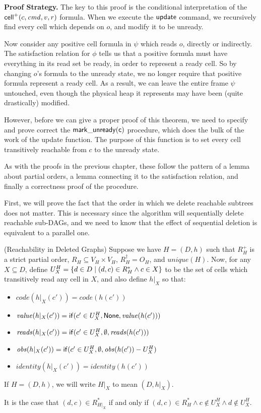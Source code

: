 \textbf{Proof Strategy.} The key to this proof is the conditional
interpretation of the $\mathsf{cell}^{+}({c}, {\mathit{cmd}}, {v}, {r})$ formula. When we execute
the $\mathsf{update}$ command, we recursively find every cell which
depends on $o$, and modify it to be unready.

Now consider any positive cell formula in $\psi$ which reads $o$,
directly or indirectly. The satisfaction relation for $\phi$ tells us
that a positive formula must have everything in its read set be ready,
in order to represent a ready cell. So by changing $o$'s formula to
the unready state, we no longer require that positive formula
represent a ready cell. As a result, we can leave the entire frame
$\psi$ untouched, even though the physical heap it represents may have
been (quite drastically) modified.

However, before we can give a proper proof of this theorem, we need to
specify and prove correct the $\mathsf{mark\_unready(c)}$ procedure,
which does the bulk of the work of the update function. The purpose of
this function is to set every cell transitively reachable from $c$ to
the unready state.

As with the proofs in the previous chapter, these follow the pattern 
of a lemma about partial orders, a lemma connecting it to the satisfaction
relation, and finally a correctness proof of the procedure. 

First, we will prove the fact that the order in which we delete
reachable subtrees does not matter. This is necessary since the 
algorithm will sequentially delete reachable sub-DAGs, and we
need to know that the effect of sequential deletion is equivalent
to a parallel one.  

\begin{lemma}{(Reachability in Deleted Graphs)}
Suppose we have $H = (D,h)$ such that $R^+_H$ is a strict partial
order, $R_H \subseteq V_H \times V_H$, $R^\dagger_H = O_H$, and
$\mathit{unique}(H)$.  Now, for any $X \subseteq D$, define $U^H_X =
\{{{d \in D}\;|\;{(d, c) \in R^*_H \land c \in X}}\}$ to be the set
of cells which transitively read any cell in $X$, and also define
$h|_X$ so that:
\begin{itemize}
\item $\mathit{code}(h|_X(c')) = \mathit{code}(h(c'))$
\item $\mathit{value}(h|_X(c')) = \mathsf{if}({c' \in U^H_X}, {\mathsf{None}}, {\mathit{value}(h(c'))})$
\item $\mathit{reads}(h|_X(c')) = \mathsf{if}({c' \in U^H_X}, {\emptyset}, {\mathit{reads}(h(c'))})$
\item $\mathit{obs}(h|_X(c')) = \mathsf{if}({c' \in U^H_X}, {\emptyset}, {\mathit{obs}(h(c')) - U^H_X})$
\item $\mathit{identity}(h|_X(c')) = \mathit{identity}(h(c'))$
\end{itemize}
If $H = (D,h)$, we will write $H|_X$ to mean $(D,h|_X)$. 

It is the case that $(d,c) \in R^*_{H|_X}$ if and only if $(d,c) \in R^*_H \land c \not\in U^H_X \land d \not\in U^H_X$. 
\end{lemma}

